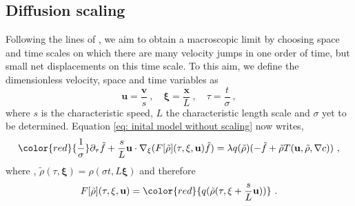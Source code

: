 \documentclass[review,onefignum,onetabnum]{siamart220329}
\begin{document}
\subsection{Diffusion scaling} Following the lines of \cite{Hillen2009}, we aim to obtain a macroscopic limit by choosing space and time scales on which {there are many velocity jumps in one order of time, but small net displacements on this time scale}. To this aim, we define the dimensionless velocity, space and time variables as
$$
\mathbf{u} = \frac{\mathbf{v}}{s}\ , \quad \mathbf{\xi} = \frac{\mathbf{x}}{L}\ , \quad \tau = \frac{t}{\sigma}\ ,
$$
\noindent where $s$ is the characteristic speed, $L$ the characteristic length scale and $\sigma$ yet to be determined. Equation \cref{eq: inital model without scaling} now writes,
\begin{equation}
    {\color{red}{\frac{1}{\sigma}}} \partial_\tau \tilde{f}+ \frac{s}{L} \mathbf{u} \cdot \nabla_\xi (F[\tilde{\rho}](\tau,\mathbf{\xi},\mathbf{u}) \tilde{f})= \lambda q(\tilde{\rho})(-\tilde{f}+\tilde{\rho} T(\mathbf{u},\tilde{\rho},\nabla c))\ ,\label{eq: scaled model}
\end{equation}
\noindent where {}, $\tilde{\rho}(\tau,\mathbf{\xi}) = \rho(\sigma t,L \mathbf{\xi})$ and therefore 
$$
F[\tilde{\rho}](\tau,\mathbf{\xi},\mathbf{u}) = {\color{red}{q(\tilde{\rho}(\tau, \mathbf{\xi} + \frac{s}{L} \mathbf{u}))}}\ .
$$
\end{document}
